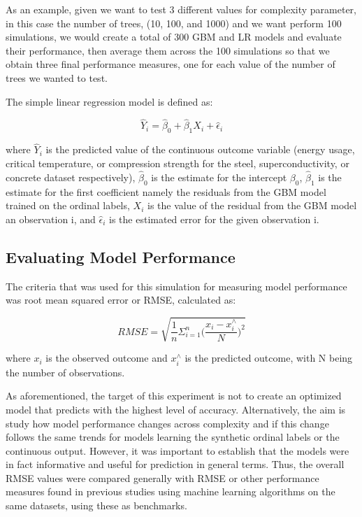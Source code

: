\documentclass[10pt]{article}\usepackage[]{graphicx}\usepackage[]{xcolor}
\begin{document}
As an example, given we want to test 3 different values for complexity parameter, in this case the number of trees, (10, 100, and 1000) and we want perform 100 simulations, we would create a total of 300 GBM and LR models and evaluate their performance, then average them across the 100 simulations so that we obtain three final performance measures, one for each value of the number of trees we wanted to test.

The simple linear regression model is defined as:

\begin{equation*}
\hat{Y}_i = \hat{\beta}_0 + \hat{\beta}_1 X_i + \hat{\epsilon}_i
\end{equation*}

where $\hat{Y}_i$ is the predicted value of the continuous outcome variable (energy usage, critical temperature, or compression strength for the steel, superconductivity, or concrete dataset respectively), $\hat{\beta}_0$ is the estimate for the intercept ${\beta}_0$, $\hat{\beta}_1$ is the estimate for the first coefficient namely the residuals from the GBM model trained on the ordinal labels, $X_i$ is the value of the residual from the GBM model an observation i, and $\hat{\epsilon}_i$ is the estimated error for the given observation i.

\subsection{Evaluating Model Performance}
The criteria that was used for this simulation for measuring model performance was root mean squared error or RMSE, calculated as:

\begin{equation*}
RMSE = \sqrt{\frac{1}{n}\Sigma_{i=1}^{n}{\Big(\frac{x_i - x_i^\wedge}{N}\Big)^2}}
\end{equation*}

where \(x_i\) is the observed outcome and \(x_i^\wedge\) is the predicted outcome, with N being the number of observations.

As aforementioned, the target of this experiment is not to create an optimized model that predicts with the highest level of accuracy. Alternatively, the aim is study how model performance changes across complexity and if this change follows the same trends for models learning the synthetic ordinal labels or the continuous output. However, it was important to establish that the models were in fact informative and useful for prediction in general terms. Thus, the overall RMSE values were compared generally with RMSE or other performance measures found in previous studies using machine learning algorithms on the same datasets, using these as benchmarks.
\end{document}
